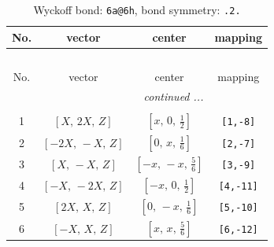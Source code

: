 \documentclass[fleqn,8pt]{jsarticle}
\begin{document}
\renewcommand{\arraystretch}{1.2}
\begin{longtable}{cccc}
\caption{Wyckoff bond: {\tt 6a@6h}, bond symmetry: {\tt .2.}}
 \\
 \hline \hline
No. & vector & center & mapping \\ \hline \endfirsthead

\multicolumn{3}{l}{\tablename\ \thetable{}} \\
 \hline \hline
No. & vector & center & mapping \\ \hline \endhead

 \hline \hline
\multicolumn{3}{r}{\footnotesize\it continued ...} \\ \endfoot

 \hline \hline
\multicolumn{3}{r}{} \\ \endlastfoot

1 & $\left[ X,\, 2 X,\, Z \right]$ & $\left[ x,\, 0,\, \frac{1}{2} \right]$ & {\tt [1,-8]} \\ \hline
2 & $\left[ - 2 X,\, - X,\, Z \right]$ & $\left[ 0,\, x,\, \frac{1}{6} \right]$ & {\tt [2,-7]} \\ \hline
3 & $\left[ X,\, - X,\, Z \right]$ & $\left[ - x,\, - x,\, \frac{5}{6} \right]$ & {\tt [3,-9]} \\ \hline
4 & $\left[ - X,\, - 2 X,\, Z \right]$ & $\left[ - x,\, 0,\, \frac{1}{2} \right]$ & {\tt [4,-11]} \\ \hline
5 & $\left[ 2 X,\, X,\, Z \right]$ & $\left[ 0,\, - x,\, \frac{1}{6} \right]$ & {\tt [5,-10]} \\ \hline
6 & $\left[ - X,\, X,\, Z \right]$ & $\left[ x,\, x,\, \frac{5}{6} \right]$ & {\tt [6,-12]} \\
\end{longtable}
\renewcommand{\arraystretch}{1.2}
\end{document}
